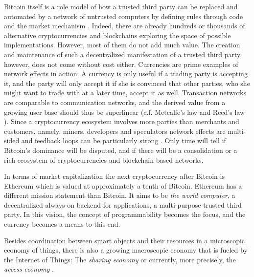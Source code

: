 Bitcoin itself is a role model of how a trusted third party can be replaced and automated by a network of untrusted computers by defining rules through code and the market mechanism \parencite{lessig2009code}. Indeed, there are already hundreds or thousands of alternative cryptocurrencies and blockchains exploring the space of possible implementations. However, most of them do not add much value. The creation and maintenance of such a decentralized manifestation of a trusted third party, however, does not come without cost either. Currencies are prime examples of network effects in action: A currency is only useful if a trading party is accepting it, and the party will only accept it if she is convinced that other parties, who she might want to trade with at a later time, accept it as well. Transaction networks are comparable to communication networks, and the derived value from a growing user base should thus be superlinear (c.f. Metcalfe's law \parencite{10.1109/MC.2013.374} and Reed's law \parencite{reed1999sneaky}). Since a cryptocurrency ecosystem involves more parties than merchants and customers, namely, miners, developers and speculators network effects are multi-sided and feedback loops can be particularly strong \parencite{Giaglis2014}. Only time will tell if Bitcoin's dominance will be disputed, and if there will be a consolidation or a rich ecosystem of cryptocurrencies and blockchain-based networks.

In terms of  market capitalization the next cryptocurrency after Bitcoin is Ethereum \parencite{ethereumWhite} which is valued at approximately a tenth of Bitcoin. Ethereum has a different mission statement than Bitcoin. It aims to be \emph{the world computer}, a decentralized always-on backend for applications, a multi-purpose trusted third party. In this vision, the concept of programmability becomes the focus, and the currency becomes a means to this end.

Besides coordination between smart objects and their resources in a microscopic economy of things, there is also a growing macroscopic economy that is fueled by the Internet of Things: The \emph{sharing economy} \parencite{sundararajan2016sharing} or currently, more precisely, the \emph{access economy} \parencite{eckhardt2015sharing}.

